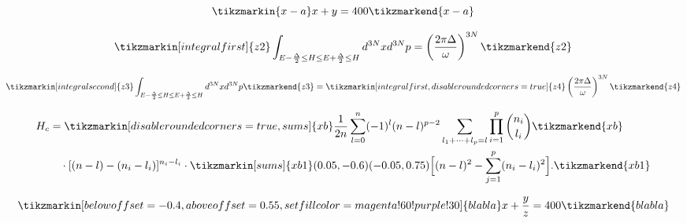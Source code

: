 \documentclass[a4paper,12pt]{article}
\begin{document}
\[\tikzmarkin{x-a}x + y = 400\tikzmarkend{x-a}\]

\vspace*{3ex}

\[
\tikzmarkin[integral first]{z2}
\int_{
E - \frac{\Delta}{2} \le H \le E + \frac{\Delta}{2} \le H
}
 d^{3N} x d^{3N} p
=
\left( \frac{2 \pi \Delta}{\omega} \right)^{3N}
\tikzmarkend{z2}
\]

\vspace*{3ex}

\[
\tikzmarkin[integral second]{z3}
\int_{
E - \frac{\Delta}{2} \le H \le E + \frac{\Delta}{2} \le H
}
 d^{3N} x d^{3N} p
\tikzmarkend{z3}
=
\tikzmarkin[integral first,disable rounded corners=true]{z4}
\left( \frac{2 \pi \Delta}{\omega} \right)^{3N}
\tikzmarkend{z4}
\]

\vspace*{3ex}

\begin{equation}
\begin{split}
H_c&=\tikzmarkin[disable rounded corners=true,sums]{xb}\frac{1}{2n} \sum^n_{l=0}(-1)^{l}(n-{l})^{p-2}
\sum_{l _1+\dots+ l _p=l}\prod^p_{i=1} \binom{n_i}{l _i}\tikzmarkend{xb}\\
&\quad\cdot[(n-l )-(n_i-l _i)]^{n_i-l _i}\cdot
\tikzmarkin[sums]{xb1}(0.05,-0.6)(-0.05,0.75)
\Bigl[(n-l )^2-\sum^p_{j=1}(n_i-l _i)^2\Bigr].
\tikzmarkend{xb1}
\end{split}
\end{equation}

\vspace*{3ex}

\[
\tikzmarkin[below offset=-0.4,
  above offset=0.55,
  set fill color=magenta!60!purple!30]{bla bla}
x + \dfrac{y}{z} = 400
\tikzmarkend{bla bla}
\]
\end{document}
